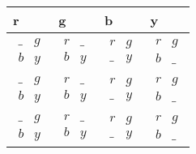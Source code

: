 \documentclass[a4paper]{article}
\begin{document}
\begin{tabular}{|l|l|l|l|}
\hline
r & g & b & y \\ \hline
$\begin{matrix}   \_ & g \\   b & y  \end{matrix}$ & $\begin{matrix}   r & \_ \\   b & y  \end{matrix}$ & $\begin{matrix}   r & g \\   \_ & y  \end{matrix}$ & $\begin{matrix}   r & g \\   b & \_  \end{matrix}$ \\ \hline
$\begin{matrix}   \_ & g \\   b & y  \end{matrix}$ & $\begin{matrix}   r & \_ \\   b & y  \end{matrix}$ & $\begin{matrix}   r & g \\   \_ & y  \end{matrix}$ & $\begin{matrix}   r & g \\   b & \_  \end{matrix}$ \\ \hline
$\begin{matrix}   \_ & g \\   b & y  \end{matrix}$ & $\begin{matrix}   r & \_ \\   b & y  \end{matrix}$ & $\begin{matrix}   r & g \\   \_ & y  \end{matrix}$ & $\begin{matrix}   r & g \\   b & \_  \end{matrix}$ \\ \hline
\end{tabular}\\\\
\end{document}
